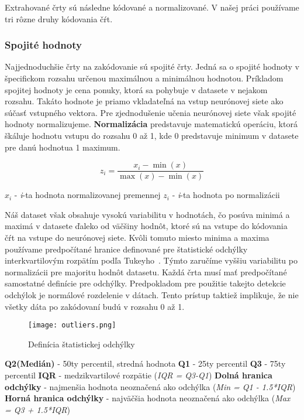 Extrahované črty sú následne kódované a normalizované. V našej práci používame tri rôzne druhy kódovania čŕt. 
\subsubsection*{Spojité hodnoty}

Najjednoduchšie črty na zakódovanie sú spojité črty. Jedná sa o spojité hodnoty v špecifickom rozsahu určenou maximálnou a minimálnou hodnotou. Príkladom spojitej hodnoty je cena ponuky, ktorá sa pohybuje v datasete v nejakom rozsahu. Takáto hodnote je priamo vkladateľná na vstup neurónovej siete ako súčasť vstupného vektora. Pre zjednodušenie učenia neurónovej siete však spojité hodnoty normalizujeme. \textbf{Normalizácia} predstavuje matematickú operáciu, ktorá škáluje hodnotu vstupu do rozsahu 0 až 1, kde 0 predstavuje minimum v datasete pre danú hodnotua 1 maximum.

$$z_i=\frac{x_i-\min(x)}{\max(x)-\min(x)}$$\newline

$x_i$ - \textit{i}-ta hodnota normalizovanej premennej\newline
$z_i$ - \textit{i}-ta hodnota po normalizácii

Náš dataset však obsahuje vysokú variabilitu v hodnotách, čo posúva minimá a maximá v datasete ďaleko od väčšiny hodnôt, ktoré sú na vstupe do kódovania čŕt na vstupe do neurónovej siete.\newline
Kvôli tomuto miesto minima a maxima používame predpočítané hranice definované pre štatistické odchýlky interkvartilovým rozpätím podľa Tukeyho~\cite{tukey1977exploratory}. Týmto zaručíme vyššiu variabilitu po normalizácii pre majoritu hodnôt datasetu. Každá črta musí mať predpočítané samostatné definície pre odchýlky. Predpokladom pre použitie takejto detekcie odchýlok je normálové rozdelenie v dátach. Tento prístup  taktiež implikuje, že nie všetky dáta po zakódovaní budú v rozsahu 0 až 1.

\begin{figure}[H]
\begin{center}
\texttt{[image: outliers.png]}\end{center}
\caption[outliers]{Definícia štatistickej odchýlky}
\label{fig:outliers}
\end{figure}

\textbf{Q2(Medián)} - 50ty percentil, stredná hodnota\newline
\textbf{Q1} - 25ty percentil\newline
\textbf{Q3} - 75ty percentil\newline
\textbf{IQR} - medzikvartilové rozpätie (\textit{IQR = Q3-Q1})\newline
\textbf{Dolná hranica odchýlky} - najmenšia hodnota neoznačená ako odchýlka (\textit{Min = Q1 - 1.5*IQR})\newline
\textbf{Horná hranica odchýlky} - najväčšia hodnota neoznačená ako odchýlka (\textit{Max = Q3 + 1.5*IQR})\newline


